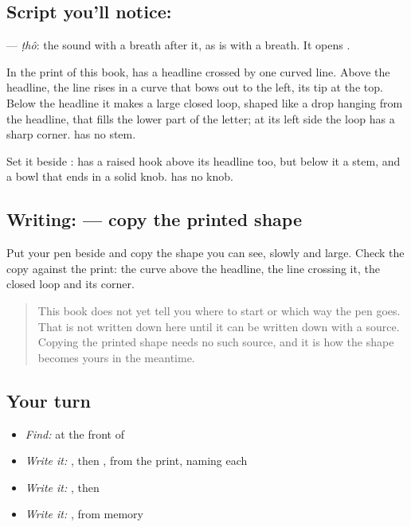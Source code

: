 \subsection*{Script you'll notice: }
\textbf{} — \emph{ṭhô}: the \textbf{} sound with a breath after it, as \textbf{} is \textbf{} with a breath. It opens \textbf{}.

In the print of this book, \textbf{} has a headline crossed by one curved line. Above the headline, the line rises in a curve that bows out to the left, its tip at the top. Below the headline it makes a large closed loop, shaped like a drop hanging from the headline, that fills the lower part of the letter; at its left side the loop has a sharp corner. \textbf{} has no stem.

Set it beside \textbf{}: \textbf{} has a raised hook above its headline too, but below it a stem, and a bowl that ends in a solid knob. \textbf{} has no knob.

\subsection*{Writing:  — copy the printed shape}
Put your pen beside \textbf{} and copy the shape you can see, slowly and large. Check the copy against the print: the curve above the headline, the line crossing it, the closed loop and its corner.

\begin{quote}
This book does not yet tell you where to start  or which way the pen goes. That is not written down here until it can be written down with a source. Copying the printed shape needs no such source, and it is how the shape becomes yours in the meantime.
\end{quote}

\subsection*{Your turn}
\begin{itemize}
\raggedright
  \item \emph{Find:}  at the front of \textbf{}
  \item \emph{Write it:} , then , from the print, naming each
  \item \emph{Write it:} \textbf{}, then \textbf{ }
  \item \emph{Write it:} , from memory
\end{itemize}

